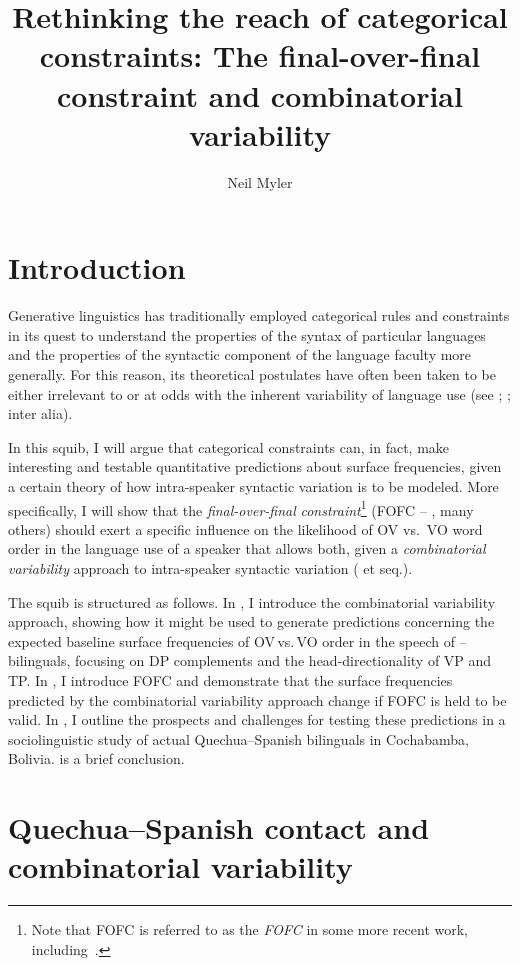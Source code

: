\documentclass[output=paper]{langsci/langscibook}
\author{Neil Myler\affiliation{Boston University}}
\title{Rethinking the reach of categorical constraints: The final-over-final
constraint and combinatorial variability}
\begin{document}
\glsresetall

\section{Introduction}

Generative linguistics has traditionally employed categorical rules and\linebreak
constraints in its quest to understand the properties of the syntax of
particular languages and the properties of the syntactic component of the
language faculty more generally.  For this reason, its theoretical postulates
have often been taken to be either irrelevant to or at odds with the inherent
variability of language use (see \citealt{Guy2005}; \citealt{Newmeyer2005};
inter alia).

In this squib, I will argue that categorical constraints can, in fact, make
interesting and testable quantitative predictions about surface frequencies,
given a certain theory of how intra-speaker syntactic variation is to be
modeled.  More specifically, I will show that the \emph{final-over-final}
\emph{constraint}\footnote{Note that \gls{FOFC} is referred to as
the \emph{\glsdesc{FOFC}} in some more recent work,
including~\textcite{SheeBibRobHol2017}.}
(\gls{FOFC} -- \citealt{BibHolRob2014,BibNewShee2009b,Holmberg2000,Walkden2009},
many others) should exert a specific influence on the likelihood of OV vs.\ VO
word order in the language use of a speaker that allows both, given a
\emph{combinatorial variability} approach to intra-speaker syntactic
variation (\citealt{Adger2006} et seq.).

The squib is structured as follows.  In , I introduce the
combinatorial variability approach, showing how it might be used to generate
predictions concerning the expected baseline surface frequencies of OV\,vs.\,VO
order in the speech of -- bilinguals, focusing on DP complements
and the head-di\-rec\-tion\-a\-lity of VP and TP. In , I introduce
FOFC and demonstrate that the surface frequencies predicted by the
combinatorial variability approach change if \gls{FOFC} is held to be valid.
In , I outline the prospects and challenges for testing
these predictions in a sociolinguistic study of actual Quechua--Spanish
bilinguals in Cochabamba, Bolivia.  is a brief conclusion.

\section{Quechua--Spanish contact and combinatorial
variability}\label{sec-30:key:1}
\end{document}
